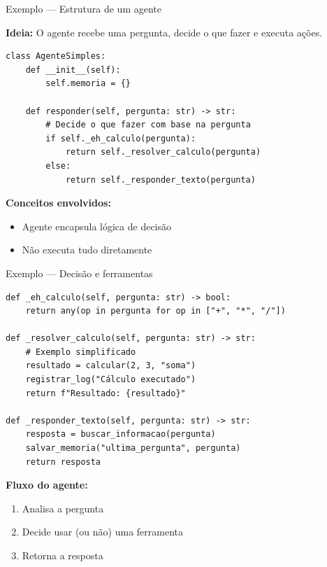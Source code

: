 \documentclass{beamer}
\begin{document}
\begin{frame}[fragile]{Exemplo — Estrutura de um agente}
    
    \textbf{Ideia:}  
    O agente recebe uma pergunta, decide o que fazer e executa ações.
    
    \begin{verbatim}
class AgenteSimples:
    def __init__(self):
        self.memoria = {}

    def responder(self, pergunta: str) -> str:
        # Decide o que fazer com base na pergunta
        if self._eh_calculo(pergunta):
            return self._resolver_calculo(pergunta)
        else:
            return self._responder_texto(pergunta)
    \end{verbatim}
    
    \vspace{0.3cm}
    
    \textbf{Conceitos envolvidos:}
    \begin{itemize}
        \item Agente encapsula lógica de decisão
        \item Não executa tudo diretamente
    \end{itemize}
    
\end{frame}

\begin{frame}[fragile]{Exemplo — Decisão e ferramentas}
    
    \begin{verbatim}
def _eh_calculo(self, pergunta: str) -> bool:
    return any(op in pergunta for op in ["+", "*", "/"])

def _resolver_calculo(self, pergunta: str) -> str:
    # Exemplo simplificado
    resultado = calcular(2, 3, "soma")
    registrar_log("Cálculo executado")
    return f"Resultado: {resultado}"

def _responder_texto(self, pergunta: str) -> str:
    resposta = buscar_informacao(pergunta)
    salvar_memoria("ultima_pergunta", pergunta)
    return resposta
    \end{verbatim}
    
    \vspace{0.3cm}
    
    \textbf{Fluxo do agente:}
    \begin{enumerate}
        \item Analisa a pergunta
        \item Decide usar (ou não) uma ferramenta
        \item Retorna a resposta
    \end{enumerate}
    
\end{frame}
\end{document}
